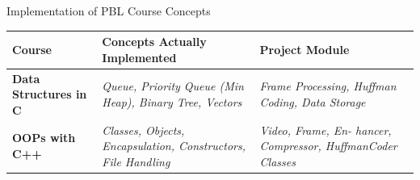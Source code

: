 \documentclass[aspectratio=169,11pt]{beamer}
\newcommand{\placeholder}[1]{%
\textit{\color{GEUGrey}#1}
}
\begin{document}
\begin{frame}{Implementation of PBL Course Concepts}

\scriptsize

\begin{center}

\renewcommand{\arraystretch}{1.25}

\begin{tabularx}{.96\textwidth}
{@{}>{\bfseries}p{3.0cm}X p{2.5cm}@{}}

\toprule
Course & Concepts Actually Implemented & Project Module\\
\midrule

Data Structures in C &
\placeholder{Queue, Priority Queue (Min Heap), Binary Tree,
Vectors} &
\placeholder{Frame Processing,
Huffman Coding, Data
Storage}\\

OOPs with C++ &
\placeholder{Classes, Objects, Encapsulation, Constructors, File
Handling} &
\placeholder{Video, Frame, En-
hancer, Compressor,
HuffmanCoder Classes}\\

\midrule

\bottomrule

\end{tabularx}

\end{center}

\end{frame}
\end{document}

